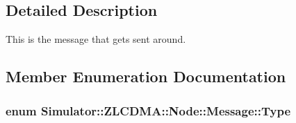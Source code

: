 \subsection{Detailed Description}
This is the message that gets sent around. 

\subsection{Member Enumeration Documentation}
\hypertarget{union_simulator_1_1_z_l_c_d_m_a_1_1_node_1_1_message_af07062ac08bff2800b7ca0ad29c28d0c}{
\subsubsection[{Type}]{\setlength{\rightskip}{0pt plus 5cm}enum {\bf Simulator\+::\+Z\+L\+C\+D\+M\+A\+::\+Node\+::\+Message\+::\+Type}}}\label{union_simulator_1_1_z_l_c_d_m_a_1_1_node_1_1_message_af07062ac08bff2800b7ca0ad29c28d0c}
